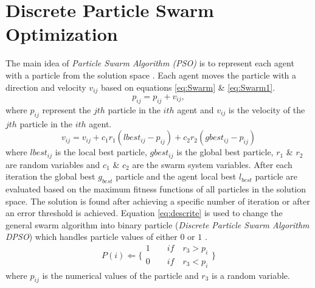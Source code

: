 \documentclass{article}
\begin{document}

\section{Discrete Particle Swarm Optimization}
\label{sec:ParticleSwarmAlgorithm}
The main idea of \textit{Particle Swarm Algorithm (PSO)} is to represent each agent with a particle from the solution space \cite{PSOFirst}. Each agent moves the particle with a direction and velocity $v_{ij}$ based on equations \ref{eq:Swarm} \& \ref{eq:Swarm1}.
\begin{equation}
p_{ij}=p_{ij}+v_{ij},
\label{eq:Swarm1}
\end{equation}
where $p_{ij}$ represent the $jth$ particle in the $ith$ agent and $v_{ij}$ is the velocity of the $jth$ particle in the $ith$ agent.
 \begin{equation}
v_{ij}  = v_{ij}  + c_1 r_1 (lbest_{ij}  - p_{ij} ) + c_2 r_2 (gbest_{ij}  - p_{ij} )
\label{eq:Swarm}
\end{equation}
 where $lbest_{ij}$ is the local best particle, $gbest_{ij}$ is the global best particle, $r_1$ \& $r_2$ are random variables and $c_1$ \& $c_2$ are the swarm system variables.
 After each iteration the global best $g_{best}$ particle and the agent local best $l_{best}$ particle are evaluated based on the maximum fitness functions of all particles in the solution space. The solution is found after achieving a specific number of iteration or after an error threshold is achieved.
Equation \ref{eq:descrite} is used to change the general swarm algorithm into binary particle (\textit{Discrete Particle Swarm Algorithm DPSO}) which handles particle values of either $0$ or $1$ \cite{PSODisceret}.  
\begin{equation}
   P(i)\Leftarrow 
\{
\begin{array}{c} 
1 \quad \quad if\quad r_{3}>p_{i}  \\

0 \quad \quad if\quad r_{3}<p_{i} 
\label{eq:descrite}
\end{array}\}
\end{equation}
 where $p_{ij}$ is the numerical values of the particle and $r_{3}$ is a random variable. 
\end{document}
